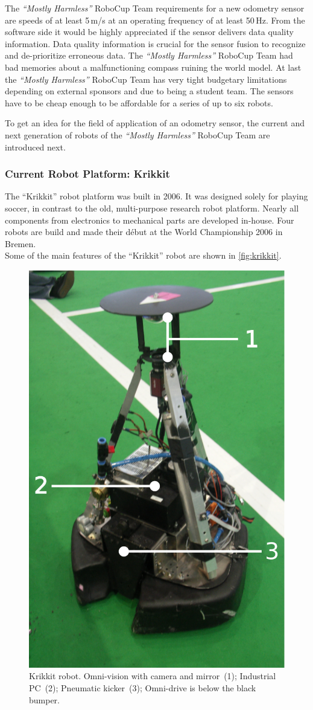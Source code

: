 \documentclass[12pt,a4paper]{article}
\newcommand{\MH}{\emph{``Mostly Harmless''} RoboCup Team\xspace}
\begin{document}
The \MH requirements for a new odometry sensor are speeds of at least 5\,m/s at an operating frequency of at least 50\,Hz.
From the software side it would be highly appreciated if the sensor delivers data quality information.
Data quality information is crucial for the sensor fusion to recognize and de-prioritize erroneous data.
The \MH had bad memories about a malfunctioning compass ruining the world model.
At last the \MH has very tight budgetary limitations depending on external sponsors and due to being a student team.
The sensors have to be cheap enough to be affordable for a series of up to six robots.

To get an idea for the field of application of an odometry sensor, the current and next generation of robots of the \MH are introduced next.



\subsubsection{Current Robot Platform: Krikkit}
\label{sec:krikkit}

The ``Krikkit'' robot platform was built in 2006. %
It was designed solely for playing soccer, in contrast to the old, multi-purpose research robot platform.
Nearly all components from electronics to mechanical parts are developed in-house.
Four robots are build and made their d\'ebut at the World Championship 2006 in Bremen.\\
Some of the main features of the ``Krikkit'' robot are shown in \autoref{fig:krikkit}.

\begin{figure}[htbp]
\begin{center}
\includegraphics[width=0.5\columnwidth]{figures/krikkit.pdf}
\caption{\label{fig:krikkit}
Krikkit robot. Omni-vision with camera and mirror~(1); Industrial PC~(2); Pneumatic kicker~(3); Omni-drive is below the black bumper.
}
\end{center}
\end{figure}
\end{document}
